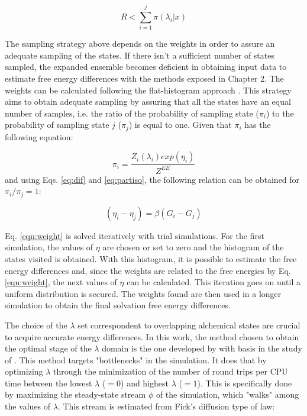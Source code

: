 \begin{equation}
R < \sum_{i=1}^{j} \pi(\lambda_{i}|x) 
\label{eqn:relee2}
\end{equation} 

The sampling strategy above depends on the weights in order to assure an adequate sampling of the states. If there isn't a sufficient number of states sampled, the expanded ensemble becomes deficient in obtaining input data to estimate free energy differences with the methods exposed in Chapter 2. The weights can be calculated following the flat-histogram approach \cite{bernd1992,bernd1993,dayal2004}. This strategy aims to obtain adequate sampling by assuring that all the states have an equal number of samples, i.e. the ratio of the probability of sampling state ($\pi_{i}$) to the probability of sampling state $j$ ($\pi_{j}$) is equal to one. Given that $\pi_{i}$ has the following equation:

\begin{equation}
\pi_{i} = \dfrac{Z_{i}(\lambda_{i}) exp(\eta_{i})}{Z^{EE}} 
\label{eqn:wei1}
\end{equation} 
and using Eqs. \ref{eq:dif} and \ref {eq:partiso}, the following relation can be obtained for $\pi_{i}/\pi_{j}=1$:

\begin{equation}
(\eta_{i} - \eta_{j}) = \beta(G_i-G_j)
\label{eqn:weight}
\end{equation}

Eq. \eqref{eqn:weight} is solved iteratively with trial simulations. For the first simulation, the values of $\eta$ are chosen or set to zero and the histogram of the states visited is obtained. With this histogram, it is possible to estimate the free energy differences and, since the weights are related to the free energies by Eq. \eqref{eqn:weight}, the next values of $\eta$ can be calculated. This iteration goes on until a uniform distribution is secured. The weights found are then used in a longer simulation to obtain the final solvation free energy differences.

The choice of the $\lambda$ set correspondent to overlapping alchemical states are crucial to acquire accurate energy differences. In this work, the method chosen to obtain the optimal stage of the $\lambda$ domain is the one developed by  with basis in the study of  . This method targets "bottlenecks" in the simulation. It does that by optimizing $\lambda$ through the minimization of the number of round trips per CPU time between the lowest $\lambda$ ($=0$) and highest $\lambda$ ($=1$). This is specifically done by maximizing the steady-state stream $\phi$ of the simulation, which "walks" among the values of $\lambda$. This stream is estimated from Fick's diffusion type of law:


